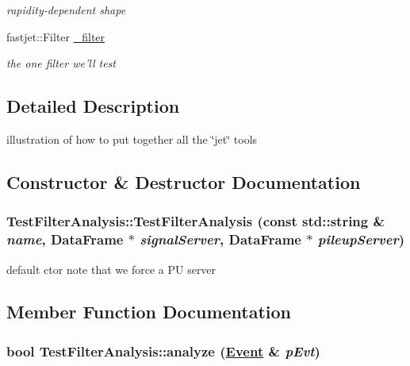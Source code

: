 \begin{CompactItemize}
\begin{CompactList}\small\item\em rapidity-dependent shape \item\end{CompactList}\item 
\hypertarget{classTestFilterAnalysis_8daf031f191a47ef4ead43366b49bdbc}{
fastjet::Filter \hyperlink{classTestFilterAnalysis_8daf031f191a47ef4ead43366b49bdbc}{\_\-filter}}
\label{classTestFilterAnalysis_8daf031f191a47ef4ead43366b49bdbc}

\begin{CompactList}\small\item\em the one filter we'll test \item\end{CompactList}\end{CompactItemize}


\subsection{Detailed Description}
illustration of how to put together all the \char`\"{}jet\char`\"{} tools 



\subsection{Constructor \& Destructor Documentation}
\hypertarget{classTestFilterAnalysis_bb1cf1c6fbaf2180127d4470222f29a3}{
\subsubsection[TestFilterAnalysis]{\setlength{\rightskip}{0pt plus 5cm}Test\-Filter\-Analysis::Test\-Filter\-Analysis (const std::string \& {\em name}, Data\-Frame $\ast$ {\em signal\-Server}, Data\-Frame $\ast$ {\em pileup\-Server})}}
\label{classTestFilterAnalysis_bb1cf1c6fbaf2180127d4470222f29a3}


default ctor note that we force a PU server 

\subsection{Member Function Documentation}
\hypertarget{classTestFilterAnalysis_83c3094d993fde404e375cf272f4e5b1}{
\subsubsection[analyze]{\setlength{\rightskip}{0pt plus 5cm}bool Test\-Filter\-Analysis::analyze (\hyperlink{classEvent}{Event} \& {\em p\-Evt})}}
\label{classTestFilterAnalysis_83c3094d993fde404e375cf272f4e5b1}


